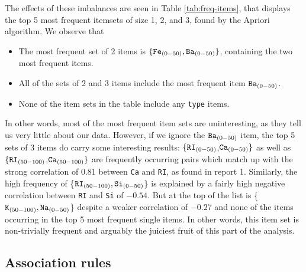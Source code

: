 The effects of these imbalances are seen in Table \ref{tab:freq-items}, that displays the top 5 most frequent itemsets of size 1, 2, and 3, found by the Apriori algorithm. We observe that

\begin{itemize}
    \item The most frequent set of 2 items is $\{\texttt{Fe}_{(0-50)},\texttt{Ba}_{(0-50)} \}$, containing the two most frequent items.
    \item All of the sets of 2 and 3 items include the most frequent item $\texttt{Ba}_{(0-50)}$.
    \item None of the item sets in the table include any \texttt{type} items.
\end{itemize}

In other words, most of the most frequent item sets are uninteresting, as they tell us very little about our data. However, if we ignore the $\texttt{Ba}_{(0-50)}$ item, the top 5 sets of 3 items do carry some interesting results: $\{ \texttt{RI}_{(0-50)}$,$\texttt{Ca}_{(0-50)} \}$ as well as $ \{ \texttt{RI}_{(50-100)}$,$\texttt{Ca}_{(50-100)} \}$ are frequently occurring pairs which match up with the strong correlation of 0.81 between \texttt{Ca} and \texttt{RI}, as found in report 1. Similarly, the high frequency of  \{$\texttt{RI}_{(50-100)},\texttt{Si}_{(0-50)}$\} is explained by a fairly high negative correlation between \texttt{RI} and \texttt{Si} of $-0.54$. But at the top of the list is \{$\texttt{K}_{(50-100)},\texttt{Na}_{(0-50)}$\} despite a weaker correlation of $-0.27$ and none of the items occurring in the top 5 most frequent single items. In other words, this item set is non-trivially frequent and arguably the juiciest fruit of this part of the analysis.

\subsection{Association rules}

